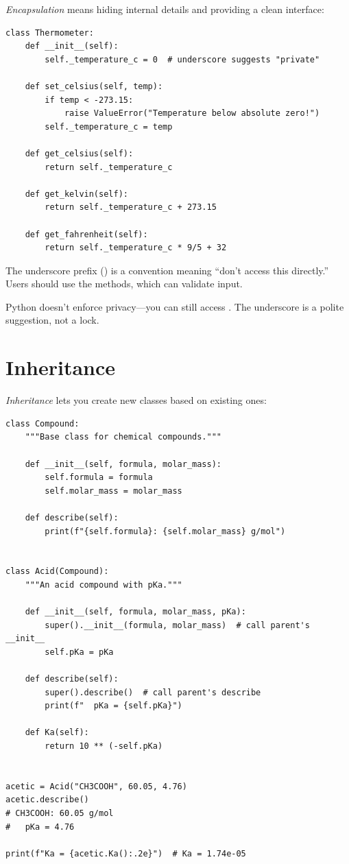 \emph{Encapsulation} means hiding internal details and providing a clean interface:

\begin{lstlisting}
class Thermometer:
    def __init__(self):
        self._temperature_c = 0  # underscore suggests "private"

    def set_celsius(self, temp):
        if temp < -273.15:
            raise ValueError("Temperature below absolute zero!")
        self._temperature_c = temp

    def get_celsius(self):
        return self._temperature_c

    def get_kelvin(self):
        return self._temperature_c + 273.15

    def get_fahrenheit(self):
        return self._temperature_c * 9/5 + 32
\end{lstlisting}

The underscore prefix () is a convention meaning ``don't access this directly.'' Users should use the methods, which can validate input.

\begin{note}
Python doesn't enforce privacy---you can still access . The underscore is a polite suggestion, not a lock.
\end{note}

\section{Inheritance}
\label{sec:inheritance}

\emph{Inheritance} lets you create new classes based on existing ones:

\begin{lstlisting}
class Compound:
    """Base class for chemical compounds."""

    def __init__(self, formula, molar_mass):
        self.formula = formula
        self.molar_mass = molar_mass

    def describe(self):
        print(f"{self.formula}: {self.molar_mass} g/mol")


class Acid(Compound):
    """An acid compound with pKa."""

    def __init__(self, formula, molar_mass, pKa):
        super().__init__(formula, molar_mass)  # call parent's __init__
        self.pKa = pKa

    def describe(self):
        super().describe()  # call parent's describe
        print(f"  pKa = {self.pKa}")

    def Ka(self):
        return 10 ** (-self.pKa)


acetic = Acid("CH3COOH", 60.05, 4.76)
acetic.describe()
# CH3COOH: 60.05 g/mol
#   pKa = 4.76

print(f"Ka = {acetic.Ka():.2e}")  # Ka = 1.74e-05
\end{lstlisting}

